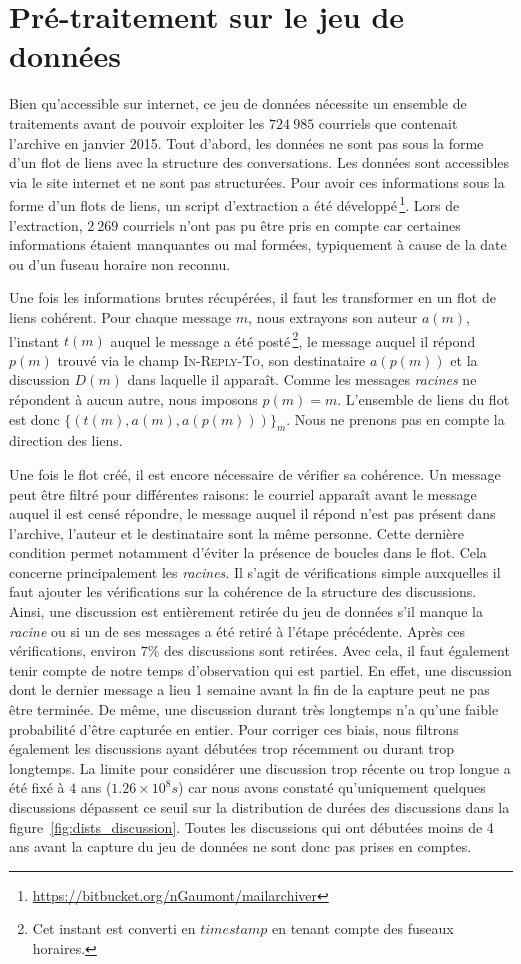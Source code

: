 \section{Pré-traitement sur le jeu de données}
Bien qu'accessible sur internet, ce jeu de données nécessite un ensemble de traitements avant de pouvoir exploiter les $724\ 985$ courriels que contenait l'archive en janvier 2015.
Tout d'abord, les données ne sont pas sous la forme d'un flot de liens avec la structure des conversations.
Les données sont accessibles via le site internet et ne sont pas structurées.
Pour avoir ces informations sous la forme d'un flots de liens, un script d'extraction a été développé\,\footnote{\url{https://bitbucket.org/nGaumont/mailarchiver}}.
Lors de l'extraction, $2\ 269$ courriels n'ont pas pu être pris en compte car certaines informations étaient manquantes ou mal formées, typiquement à cause de la date ou d'un fuseau horaire non reconnu.

Une fois les informations brutes récupérées, il faut les transformer en un flot de liens cohérent.
Pour chaque message $m$, nous extrayons son auteur $a(m)$, l'instant $t(m)$ auquel le message a été posté\,\footnote{Cet instant est converti en $timestamp$ en tenant compte des fuseaux horaires.}, le message auquel il répond $p(m)$ trouvé via le champ \textsc{In-Reply-To}, son destinataire $a(p(m))$ et la discussion $D(m)$ dans laquelle il apparaît.
Comme les messages \emph{racines} ne répondent à aucun autre, nous imposons $p(m)=m$.
L'ensemble de liens du flot est donc $\{(t(m),a(m),a(p(m)))\}_m$.
Nous ne prenons pas en compte la direction des liens.

Une fois le flot créé, il est encore nécessaire de vérifier sa cohérence.
Un message peut être filtré pour différentes raisons: le courriel apparaît avant le message auquel il est censé répondre, le message auquel il répond n'est pas présent dans l'archive, l'auteur et le destinataire sont la même personne.
Cette dernière condition permet notamment d'éviter la présence de boucles dans le flot.
Cela concerne principalement les \emph{racines}.
Il s'agit de vérifications simple auxquelles il faut ajouter les vérifications sur la cohérence de la structure des discussions.
Ainsi, une discussion est entièrement retirée du jeu de données s'il manque la \emph{racine} ou si un de ses messages a été retiré à l'étape précédente.
Après ces vérifications, environ $7\%$ des discussions sont retirées.
Avec cela, il faut également tenir compte de notre temps d'observation qui est partiel.
En effet, une discussion dont le dernier message a lieu 1 semaine avant la fin de la capture peut ne pas être terminée.
De même, une discussion durant très longtemps n'a qu'une faible probabilité d'être capturée en entier.
Pour corriger ces biais, nous filtrons également les discussions ayant débutées trop récemment ou durant trop longtemps.
La limite pour considérer une discussion trop récente ou trop longue a été fixé à $4$ ans ($1.26\times 10^8 s$) car nous avons constaté qu'uniquement quelques discussions dépassent ce seuil sur la distribution de durées des discussions dans la figure~\ref{fig:dists_discussion}.
Toutes les discussions qui ont débutées moins de 4 ans avant la capture du jeu de données ne sont donc pas prises en comptes.


